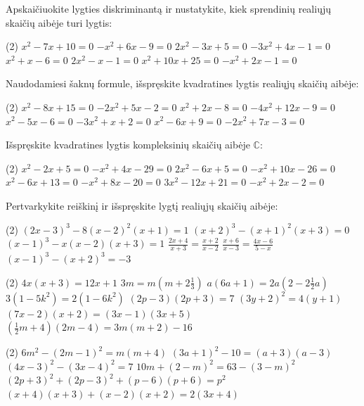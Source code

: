 \documentclass[11pt,a4paper]{scrartcl}
\begin{document}
\begin{problem}
Apskaičiuokite lygties diskriminantą ir nustatykite, kiek sprendinių realiųjų skaičių aibėje turi lygtis:
\begin{tasks}[label={(\arabic*)}, label-offset=0.9em](2)
    \task $x^2-7x+10=0$
    \task $-x^2+6x-9=0$
    \task $2x^2-3x+5=0$
    \task $-3x^2+4x-1=0$
    \task $x^2+x-6=0$
    \task $2x^2-x-1=0$
    \task $x^2+10x+25=0$
    \task $-x^2+2x-1=0$
\end{tasks}
\end{problem}

\begin{problem}
Naudodamiesi šaknų formule, išspręskite kvadratines lygtis realiųjų skaičių aibėje:
\begin{tasks}[label={(\arabic*)}, label-offset=0.9em](2)
    \task $x^2-8x+15=0$
    \task $-2x^2+5x-2=0$
    \task $x^2+2x-8=0$
    \task $-4x^2+12x-9=0$
    \task $x^2-5x-6=0$
    \task $-3x^2+x+2=0$
    \task $x^2-6x+9=0$
    \task $-2x^2+7x-3=0$
\end{tasks}
\end{problem}

\begin{problem}
Išspręskite kvadratines lygtis kompleksinių skaičių aibėje $\mathbb{C}$:
\begin{tasks}[label={(\arabic*)}, label-offset=0.9em](2)
    \task $x^2-2x+5=0$
    \task $-x^2+4x-29=0$
    \task $2x^2-6x+5=0$
    \task $-x^2+10x-26=0$
    \task $x^2-6x+13=0$
    \task $-x^2+8x-20=0$
    \task $3x^2-12x+21=0$
    \task $-x^2+2x-2=0$
\end{tasks}
\end{problem}

\begin{problem}
Pertvarkykite reiškinį ir išspręskite lygtį realiųjų skaičių aibėje:
\begin{tasks}[label={(\arabic*)}, label-offset=0.9em](2)
    \task $(2x-3)^3-8(x-2)^2(x+1)=1$
    \task $(x+2)^3-(x+1)^2(x+3)=0$
    \task $(x-1)^3-x(x-2)(x+3)=1$
    \task $\frac{2x+4}{x+3}=\frac{x+2}{x-2}$
    \task $\frac{x+6}{x-3}=\frac{4x-6}{5-x}$
    \task $(x-1)^3-(x+2)^3=-3$
\end{tasks}


\begin{tasks}[resume, label={(\arabic*)}, label-offset=0.9em](2)
    \task $4 x(x+3)=12 x+1$
    \task $3 m=m\left(m+2 \frac{1}{3}\right)$
    \task $a(6 a+1)=2 a\left(2-2 \frac{1}{2} a\right)$
    \task $3\left(1-5 k^2\right)=2\left(1-6 k^2\right)$
    \task $(2 p-3)(2 p+3)=7$
    \task $(3 y+2)^2=4(y+1)$
    \task $(7 x-2)(x+2)=(3 x-1)(3 x+5)$
    \task $\left(\frac{1}{2} m+4\right)(2 m-4)=3 m(m+2)-16$
\end{tasks}


\begin{tasks}[resume, label={(\arabic*)}, label-offset=0.9em](2)
    \task $6 m^2-(2 m-1)^2=m(m+4)$
    \task $(3 a+1)^2-10=(a+3)(a-3)$
    \task $(4 x-3)^2-(3 x-4)^2=7$
    \task $10 m+(2-m)^2=63-(3-m)^2$
    \task $(2 p+3)^2+(2 p-3)^2+(p-6)(p+6)=p^2$
    \task $(x+4)(x+3)+(x-2)(x+2)=2(3 x+4)$
\end{tasks}
\end{problem}
\end{document}
